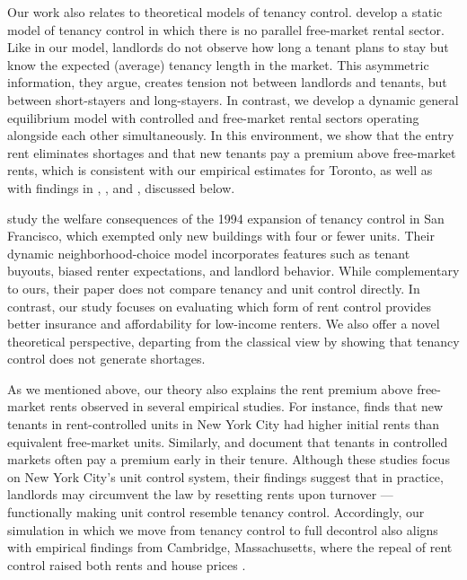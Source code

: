 \documentclass[parskip=full]{article}
\begin{document}
Our work also relates to theoretical models of tenancy control. \citet{be-2000} develop a static model of tenancy control in which there is no parallel free-market rental sector. Like in our model, landlords do not observe how long a tenant plans to stay but know the expected (average) tenancy length in the market. This asymmetric information, they argue, creates tension not between landlords and tenants, but between short-stayers and long-stayers. In contrast, we develop a dynamic general equilibrium model with controlled and free-market rental sectors operating alongside each other simultaneously. In this environment, we show that the entry rent eliminates shortages and that new tenants pay a premium above free-market rents, which is consistent with our empirical estimates for Toronto, as well as with findings in \citet{nagy-1997}, \citet{early-2000}, and \citet{cjq-2023}, discussed below.

\citet{diamond-2019} study the welfare consequences of the 1994 expansion of tenancy control in San Francisco, which exempted only new buildings with four or fewer units. Their dynamic neighborhood-choice model incorporates features such as tenant buyouts, biased renter expectations, and landlord behavior. While complementary to ours, their paper does not compare tenancy and unit control directly. In contrast, our study focuses on evaluating which form of rent control provides better insurance and affordability for low-income renters. We also offer a novel theoretical perspective, departing from the classical view by showing that tenancy control does not generate shortages.

As we mentioned above, our theory also explains the rent premium above free-market rents observed in several empirical studies. For instance, \citet{nagy-1997} finds that new tenants in rent-controlled units in New York City had higher initial rents than equivalent free-market units. Similarly, \citet{early-2000} and \citet{cjq-2023} document that tenants in controlled markets often pay a premium early in their tenure. Although these studies focus on New York City’s unit control system, their findings suggest that in practice, landlords may circumvent the law by resetting rents upon turnover — functionally making unit control resemble tenancy control. Accordingly, our simulation in which we move from tenancy control to full decontrol also aligns with empirical findings from Cambridge, Massachusetts, where the repeal of rent control raised both rents and house prices \citep{sims-2007, app-2014}.
\end{document}
